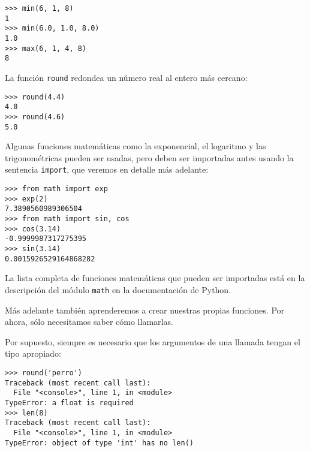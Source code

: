 \begin{lstlisting}
>>> min(6, 1, 8)
1
>>> min(6.0, 1.0, 8.0)
1.0
>>> max(6, 1, 4, 8)
8
\end{lstlisting}

La función \lstinline!round! redondea un número real al entero más
cercano:

\begin{lstlisting}
>>> round(4.4)
4.0
>>> round(4.6)
5.0
\end{lstlisting}

Algunas funciones matemáticas como la exponencial, el logaritmo y las
trigonométricas pueden ser usadas, pero deben ser importadas antes
usando la sentencia \lstinline!import!, que veremos en detalle más
adelante:

\begin{lstlisting}
>>> from math import exp
>>> exp(2)
7.3890560989306504
>>> from math import sin, cos
>>> cos(3.14)
-0.9999987317275395
>>> sin(3.14)
0.0015926529164868282
\end{lstlisting}

La lista completa de funciones matemáticas que pueden ser importadas
está en la descripción
del módulo \lstinline!math! en la documentación de Python.

Más adelante también aprenderemos a crear nuestras propias funciones.
Por ahora, sólo necesitamos saber cómo llamarlas.

Por supuesto, siempre es necesario que los argumentos de una llamada
tengan el tipo apropiado:

\begin{lstlisting}
>>> round('perro')
Traceback (most recent call last):
  File "<console>", line 1, in <module>
TypeError: a float is required
>>> len(8)
Traceback (most recent call last):
  File "<console>", line 1, in <module>
TypeError: object of type 'int' has no len()
\end{lstlisting}

